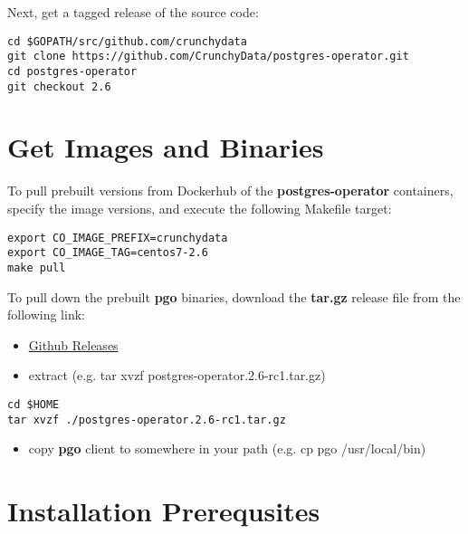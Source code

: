 \documentclass[letterpaper,12pt]{article}
\let\stdsection\section
\renewcommand\section{\newpage\stdsection}
\begin{document}
Next, get a tagged release of the source code:
\vspace{.75em}
\begin{lstlisting}
cd $GOPATH/src/github.com/crunchydata
git clone https://github.com/CrunchyData/postgres-operator.git
cd postgres-operator
git checkout 2.6
\end{lstlisting}

\section{Get Images and Binaries}\label{/_get_images_and_binaries}

To pull prebuilt versions from Dockerhub of the \textbf{postgres-operator} containers, specify the image versions, and execute the following Makefile target:
\vspace{.75em}
\begin{lstlisting}
export CO_IMAGE_PREFIX=crunchydata
export CO_IMAGE_TAG=centos7-2.6
make pull
\end{lstlisting}

To pull down the prebuilt \textbf{pgo} binaries, download the \textbf{tar.gz} release file from the following link:

\begin{itemize}
    \item \href{https://github.com/CrunchyData/postgres-operator/releases}{Github Releases} 
    \item extract (e.g. tar xvzf postgres-operator.2.6-rc1.tar.gz) 
\end{itemize}\vspace{.75em}
\begin{lstlisting}
cd $HOME
tar xvzf ./postgres-operator.2.6-rc1.tar.gz
\end{lstlisting}

\begin{itemize}
    \item copy \textbf{pgo} client to somewhere in your path (e.g. cp pgo /usr/local/bin) 
\end{itemize}
\section{Installation Prerequsites}\label{/_installation_prerequsites}
\end{document}
